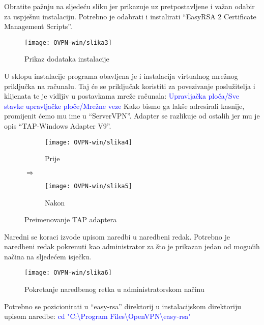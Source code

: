 Obratite pažnju na sljedeću sliku jer prikazuje uz pretpostavljene i važan odabir za uspješnu instalaciju. Potrebno je odabrati i instalirati ``EasyRSA 2 Certificate Management Scripts''.
\begin{figure}[h!]
	\centering
     \texttt{[image: OVPN-win/slika3]}
     \caption{Prikaz dodataka instalacije}
\end{figure}
\FloatBarrier
U sklopu instalacije programa obavljena je i instalacija virtualnog mrežnog priključka na računalu. Taj će se priključak koristiti za povezivanje poslužitelja i klijenata te je vidljiv u postavkama mreže računala:\smallbreak
\textcolor{blue}{Upravljačka ploča/Sve stavke upravljačke ploče/Mrežne veze}
\smallbreak
Kako bismo ga lakše adresirali kasnije, promijenit ćemo mu ime u ``ServerVPN''. Adapter se razlikuje od ostalih jer mu je opis ``TAP-Windows Adapter V9''.

\begin{figure}[h!]
    \centering
    \begin{subfigure}[b]{0.35\textwidth}
        \texttt{[image: OVPN-win/slika4]}
        \caption{Prije}
        \label{fig:prije}
    \end{subfigure}
    $\Longrightarrow$
    \begin{subfigure}[b]{0.35\textwidth}
        \texttt{[image: OVPN-win/slika5]}
        \caption{Nakon}
        \label{fig:nakon}
    \end{subfigure}
    \caption{Preimenovanje TAP adaptera}
\end{figure}
\FloatBarrier

Naredni se koraci izvode upisom naredbi u naredbeni redak. Potrebno je naredbeni redak pokrenuti kao administrator za što je prikazan jedan od mogućih načina na sljedećem isječku.

\begin{figure}[h!]
	\centering
     \texttt{[image: OVPN-win/slika6]}
     \caption{Pokretanje naredbenog retka u administratorskom načinu}
\end{figure}
\FloatBarrier

Potrebno se pozicionirati u ``easy-rsa'' direktorij u instalacijskom direktoriju upisom naredbe:\smallbreak
\textcolor{blue}{cd "C:\textbackslash Program Files\textbackslash OpenVPN\textbackslash easy-rsa"}
\smallbreak

